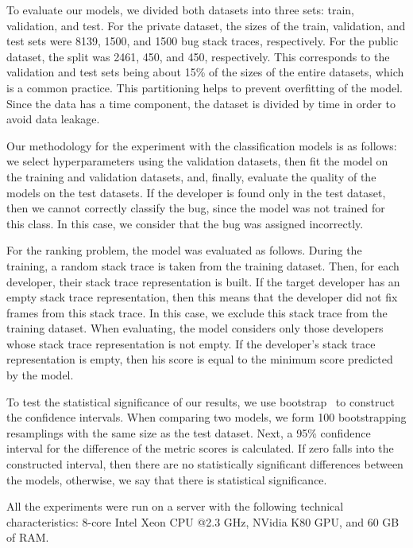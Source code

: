 
To evaluate our models, we divided both datasets into three sets: train, validation, and test. For the private dataset, the sizes of the train, validation, and test sets were 8139, 1500, and 1500 bug stack traces, respectively. For the public dataset, the split was 2461, 450, and 450, respectively. This corresponds to the validation and test sets being about 15\% of the sizes of the entire datasets, which is a common practice. This partitioning helps to prevent overfitting of the model. Since the data has a time component, the dataset is divided by time in order to avoid data leakage.

Our methodology for the experiment with the classification models is as follows: we select hyperparameters using the validation datasets, then fit the model on the training and validation datasets, and, finally, evaluate the quality of the models on the test datasets. If the developer is found only in the test dataset, then we cannot correctly classify the bug, since the model was not trained for this class. In this case, we consider that the bug was assigned incorrectly.

For the ranking problem, the model was evaluated as follows. During the training, a random stack trace is taken from the training dataset. Then, for each developer, their stack trace representation is built. If the target developer has an empty stack trace representation, then this means that the developer did not fix frames from this stack trace. In this case, we exclude this stack trace from the training dataset. When evaluating, the model considers only those developers whose stack trace representation is not empty. If the developer's stack trace representation is empty, then his score is equal to the minimum score predicted by the model.

To test the statistical significance of our results, we use bootstrap~\cite{Efron1979BootstrapMA} to construct the confidence intervals. When comparing two models, we form 100 bootstrapping resamplings with the same size as the test dataset. Next, a 95\% confidence interval for the difference of the metric scores is calculated. If zero falls into the constructed interval, then there are no statistically significant differences between the models, otherwise, we say that there is statistical significance. 

All the experiments were run on a server with the following technical characteristics: 8-core Intel Xeon CPU @2.3 GHz, NVidia K80 GPU, and 60 GB of RAM.

